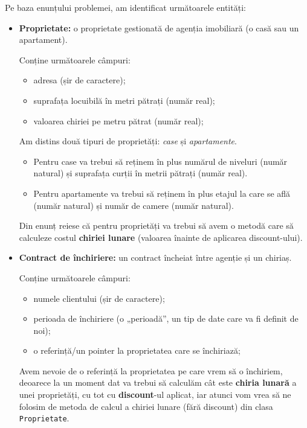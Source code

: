Pe baza enunțului problemei, am identificat următoarele entități:
\begin{itemize}
    \item \textbf{Proprietate:} o proprietate gestionată de agenția imobiliară (o casă sau un apartament).

    Conține următoarele câmpuri:
    \begin{itemize}
        \item adresa (șir de caractere);
        \item suprafața locuibilă în metri pătrați (număr real);
        \item valoarea chiriei pe metru pătrat (număr real);
    \end{itemize}

    Am distins două tipuri de proprietăți: \emph{case} și \emph{apartamente}.
    \begin{itemize}
        \item Pentru case va trebui să reținem în plus numărul de niveluri (număr natural) și suprafața curții în metrii pătrați (număr real).
        \item Pentru apartamente va trebui să reținem în plus etajul la care se află (număr natural) și număr de camere (număr natural).
    \end{itemize}

    Din enunț reiese că pentru proprietăți va trebui să avem o metodă care să calculeze costul \textbf{chiriei lunare} (valoarea înainte de aplicarea discount-ului).

    \item \textbf{Contract de închiriere:} un contract încheiat între agenție și un chiriaș.

    Conține următoarele câmpuri:
    \begin{itemize}
        \item numele clientului (șir de caractere);
        \item perioada de închiriere (o „perioadă”, un tip de date care va fi definit de noi);
        \item o referință/un pointer la proprietatea care se închiriază;
    \end{itemize}

    Avem nevoie de o referință la proprietatea pe care vrem să o închiriem, deoarece la un moment dat va trebui să calculăm cât este \textbf{chiria lunară} a unei proprietăți, cu tot cu \textbf{discount}-ul aplicat, iar atunci vom vrea să ne folosim de metoda de calcul a chiriei lunare (fără discount) din clasa \texttt{Proprietate}.


\end{itemize}
